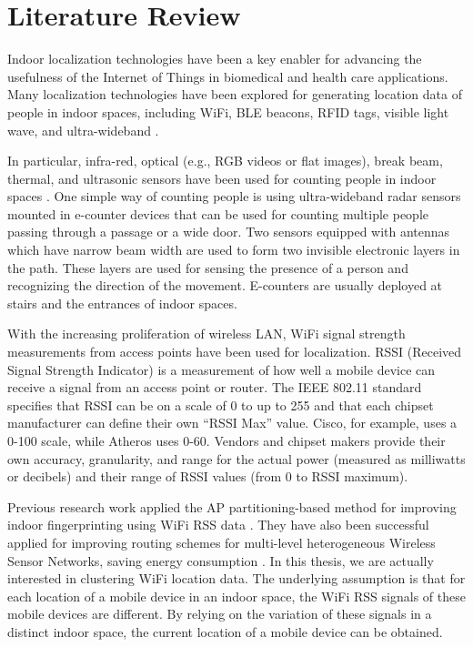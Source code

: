 \setlength{\parindent}{2em}
% 
\chapter{Literature Review}

Indoor localization technologies have been a key enabler for advancing the usefulness of the Internet of Things in biomedical and health care applications. Many localization technologies have been explored for generating location data of people in indoor spaces, including WiFi, BLE beacons, RFID tags, visible light wave, and ultra-wideband \cite{namiot2015indoor, jeon2018ble}. 

In particular, infra-red, optical (e.g., RGB videos or flat images), break beam, thermal, and ultrasonic sensors have been used for counting people in indoor spaces \cite{mautz2012indoor}. One simple way of counting people is using ultra-wideband radar sensors mounted in e-counter devices that can be used for counting multiple people passing through a passage or a wide door. Two sensors equipped with antennas which have narrow beam width are used to form two invisible electronic layers in the path. These layers are used for sensing the presence of a person and recognizing the direction of the movement.  E-counters are usually deployed at stairs and the entrances of indoor spaces. 

With the increasing proliferation of wireless LAN, WiFi signal strength measurements from access points have been used for localization. RSSI (Received Signal Strength Indicator) is a measurement of how well a mobile device can receive a signal from an access point or router. The IEEE 802.11 standard specifies that RSSI can be on a scale of 0 to up to 255 and that each chipset manufacturer can define their own “RSSI Max” value. Cisco, for example, uses a 0-100 scale, while Atheros uses 0-60. Vendors and chipset makers provide their own accuracy, granularity, and range for the actual power (measured as milliwatts or decibels) and their range of RSSI values (from 0 to RSSI maximum). 

Previous research work applied the AP partitioning-based method for improving indoor fingerprinting using WiFi RSS data \cite{hu2015improving, subedi2019improving}. They have also been successful applied for improving routing schemes for multi-level heterogeneous Wireless Sensor Networks, saving energy consumption \cite{wang2019affinity}. In this thesis, we are actually interested in clustering WiFi location data. The underlying assumption is that for each location of a mobile device in an indoor space, the WiFi RSS signals of these mobile devices are different. By relying on the variation of these signals in a distinct indoor space, the current location of a mobile device can be obtained.

